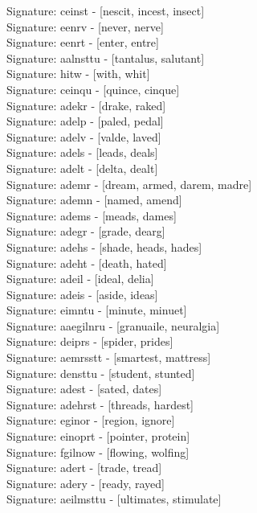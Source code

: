 Signature: {ceinst} - [nescit, incest, insect] \\
Signature: {eenrv} - [never, nerve] \\
Signature: {eenrt} - [enter, entre] \\
Signature: {aalnsttu} - [tantalus, salutant] \\
Signature: {hitw} - [with, whit] \\
Signature: {ceinqu} - [quince, cinque] \\
Signature: {adekr} - [drake, raked] \\
Signature: {adelp} - [paled, pedal] \\
Signature: {adelv} - [valde, laved] \\
Signature: {adels} - [leads, deals] \\
Signature: {adelt} - [delta, dealt] \\
Signature: {ademr} - [dream, armed, darem, madre] \\
Signature: {ademn} - [named, amend] \\
Signature: {adems} - [meads, dames] \\
Signature: {adegr} - [grade, dearg] \\
Signature: {adehs} - [shade, heads, hades] \\
Signature: {adeht} - [death, hated] \\
Signature: {adeil} - [ideal, delia] \\
Signature: {adeis} - [aside, ideas] \\
Signature: {eimntu} - [minute, minuet] \\
Signature: {aaegilnru} - [granuaile, neuralgia] \\
Signature: {deiprs} - [spider, prides] \\
Signature: {aemrsstt} - [smartest, mattress] \\
Signature: {densttu} - [student, stunted] \\
Signature: {adest} - [sated, dates] \\
Signature: {adehrst} - [threads, hardest] \\
Signature: {eginor} - [region, ignore] \\
Signature: {einoprt} - [pointer, protein] \\
Signature: {fgilnow} - [flowing, wolfing] \\
Signature: {adert} - [trade, tread] \\
Signature: {adery} - [ready, rayed] \\
Signature: {aeilmsttu} - [ultimates, stimulate] \\
